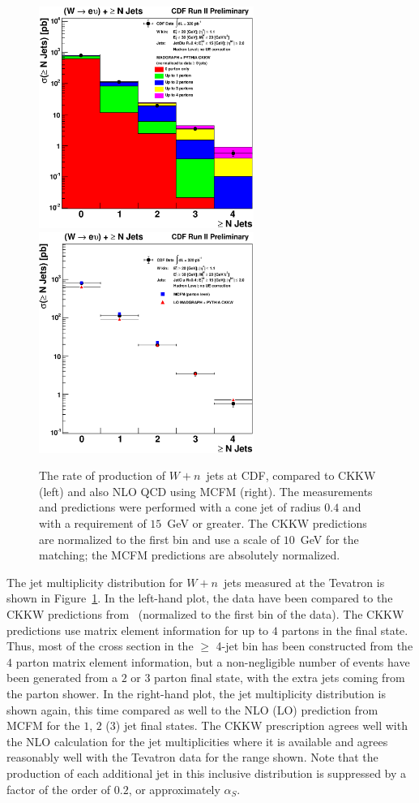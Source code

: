 \documentclass[12pt]{iopart}
\def\as{\alpha_S}
\begin{document}
%
\begin{figure}[t]
\begin{center}
\includegraphics[width=7cm]{jmulti_ckkw0.eps}
\includegraphics[width=7cm]{jmulti_ckkw_withmcfm.eps}
\end{center}
\caption{
The rate of production of $W + n$~jets at CDF, compared to CKKW (left) and also NLO QCD using MCFM (right).
The measurements and predictions were performed with a cone jet of radius
$0.4$ and with a requirement of $15$~GeV or greater. The CKKW predictions are
normalized to the first bin and use a scale of $10$~GeV for the matching; the MCFM predictions are absolutely normalized.} 
\label{fig:jet_mult}
\end{figure}
%
The jet multiplicity distribution for $W + n$~jets measured at the Tevatron is shown in Figure~\ref{fig:jet_mult}. In the
left-hand plot, the data have been compared to the CKKW predictions from~\cite{Mrenna:2003if} (normalized to the first bin of
the data). The CKKW predictions use matrix element information for up to $4$ partons in the final state. Thus, most of the cross section in
the $\ge$ 4-jet bin has been constructed from the $4$ parton matrix element information, but a non-negligible number of events have been
generated from a $2$ or $3$ parton final state, with the extra jets coming from the parton shower. In the right-hand plot, the jet
multiplicity distribution is shown again, this time compared as well to the NLO (LO) prediction from MCFM for the $1$, $2$ ($3$) jet final
states.  The CKKW prescription agrees well with the NLO calculation for the jet multiplicities where it is available and agrees reasonably
well with the Tevatron data for the range shown. Note that the  production of each additional jet in this inclusive distribution is
suppressed by a factor of the order of $0.2$, or approximately $\as$. 
\end{document}
